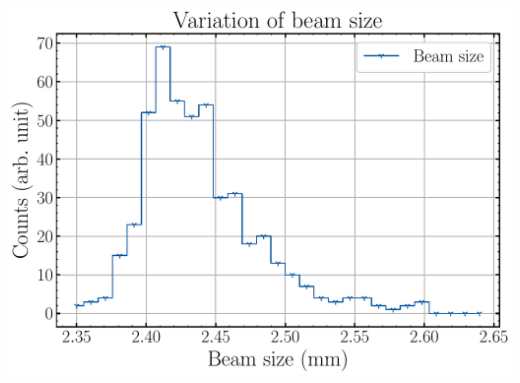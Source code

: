 \begin{frame}[t]
\begin{columns}[T]
\begin{column}{0.45\textwidth}
      \includegraphics[width=1\textwidth]{04_Test/fig/fig000_hist_variation_b}
    \end{column}
  \end{columns}
\end{frame}

